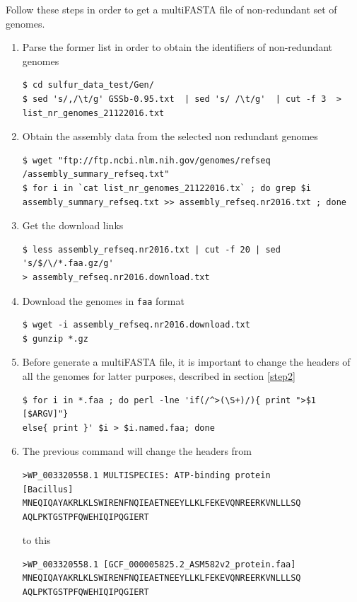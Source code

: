 \documentclass[12pt]{report}
\begin{document}
Follow these steps in order to get a multiFASTA file of non-redundant set of genomes.  
\begin{enumerate} 
\item Parse the former list in order to obtain the identifiers of non-redundant
genomes

\begin{verbatim}
$ cd sulfur_data_test/Gen/
$ sed 's/,/\t/g' GSSb-0.95.txt  | sed 's/ /\t/g'  | cut -f 3  > 
list_nr_genomes_21122016.txt
\end{verbatim}

\item Obtain the assembly data from the selected non redundant genomes 
\label{assembly_file}
\begin{verbatim}
$ wget "ftp://ftp.ncbi.nlm.nih.gov/genomes/refseq
/assembly_summary_refseq.txt" 
$ for i in `cat list_nr_genomes_21122016.tx` ; do grep $i 
assembly_summary_refseq.txt >> assembly_refseq.nr2016.txt ; done
\end{verbatim}

\item Get the download links 

\begin{verbatim}
$ less assembly_refseq.nr2016.txt | cut -f 20 | sed 's/$/\/*.faa.gz/g' 
> assembly_refseq.nr2016.download.txt
\end{verbatim}

\item Download the genomes in \verb+faa+ format  

\begin{verbatim}
$ wget -i assembly_refseq.nr2016.download.txt
$ gunzip *.gz 
\end{verbatim}
\item Before generate a multiFASTA file, it is important to change the headers of all the genomes for latter purposes, described in section \ref{step2}

\begin{verbatim}
$ for i in *.faa ; do perl -lne 'if(/^>(\S+)/){ print ">$1 [$ARGV]"} 
else{ print }' $i > $i.named.faa; done
\end{verbatim}
\item The previous command will change the headers from
\begin{verbatim}
>WP_003320558.1 MULTISPECIES: ATP-binding protein 
[Bacillus]
MNEQIQAYAKRLKLSWIRENFNQIEAETNEEYLLKLFEKEVQNREERKVNLLLSQ
AQLPKTGSTPFQWEHIQIPQGIERT
\end{verbatim}
to this 
\begin{verbatim}
>WP_003320558.1 [GCF_000005825.2_ASM582v2_protein.faa]
MNEQIQAYAKRLKLSWIRENFNQIEAETNEEYLLKLFEKEVQNREERKVNLLLSQ
AQLPKTGSTPFQWEHIQIPQGIERT
\end{verbatim}


\end{enumerate}
\end{document}
